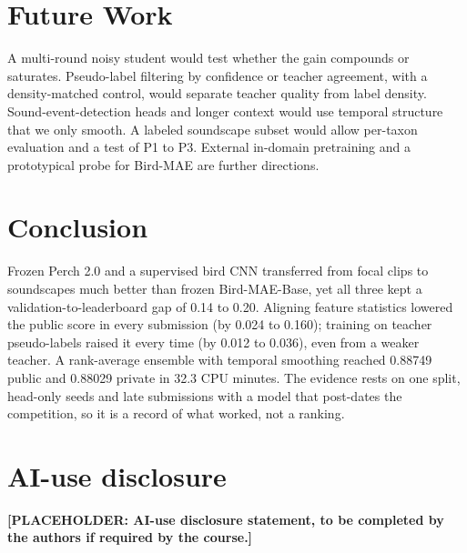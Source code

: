 \documentclass[letterpaper]{article} %
\begin{document}
\section{Future Work}
A multi-round noisy student would test whether the gain compounds or saturates. Pseudo-label filtering by confidence or teacher agreement, with a density-matched control, would separate teacher quality from label density. Sound-event-detection heads and longer context would use temporal structure that we only smooth. A labeled soundscape subset would allow per-taxon evaluation and a test of P1 to P3. External in-domain pretraining and a prototypical probe for Bird-MAE are further directions.

\section{Conclusion}
Frozen Perch 2.0 and a supervised bird CNN transferred from focal clips to soundscapes much better than frozen Bird-MAE-Base, yet all three kept a validation-to-leaderboard gap of 0.14 to 0.20. Aligning feature statistics lowered the public score in every submission (by 0.024 to 0.160); training on teacher pseudo-labels raised it every time (by 0.012 to 0.036), even from a weaker teacher. A rank-average ensemble with temporal smoothing reached 0.88749 public and 0.88029 private in 32.3 CPU minutes. The evidence rests on one split, head-only seeds and late submissions with a model that post-dates the competition, so it is a record of what worked, not a ranking.

\section*{AI-use disclosure}
\textbf{[PLACEHOLDER: AI-use disclosure statement, to be completed by the authors if required by the course.]}


\end{document}
